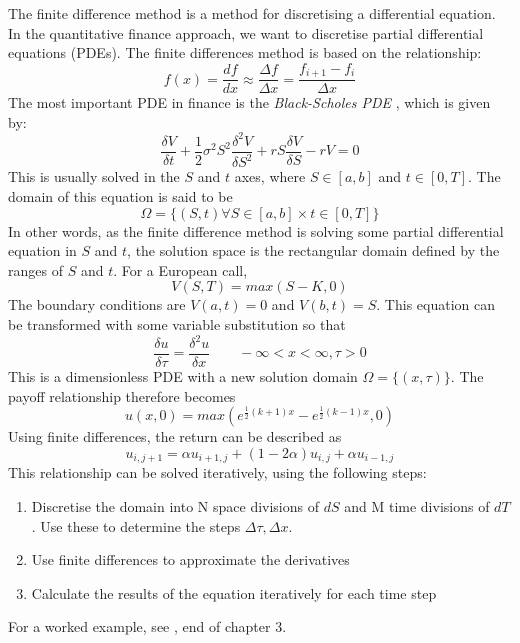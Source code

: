 The finite difference method is a method for discretising a differential equation.\cite{advancedquantcpp} In the quantitative finance approach, we want to discretise partial differential equations (PDEs). The finite differences method is based on the relationship:
\begin{equation}
f(x) = \frac{df}{dx} \approx \frac{\Delta f}{\Delta x} = \frac{f_{i+1}-f_i}{\Delta x}
\end{equation}
The most important PDE in finance is the {\em Black-Scholes PDE}
, which is given by:
\begin{equation}
\frac{\delta V}{\delta t} + \frac{1}{2}\sigma^2S^2\frac{\delta^2V}{\delta S^2}+rS\frac{\delta V}{\delta S}-rV=0
\label{eq:blackscholeseq}
\end{equation}
This is usually solved in the $S$ and $t$ axes, where $S\in [a,b]$ and $t\in [0,T]$. The domain of this equation is said to be 
\begin{equation}
\Omega=\{(S,t)\forall S\in [a,b]\times t\in [0,T]\}
\end{equation}
In other words, as the finite difference method is solving some partial differential equation in $S$ and $t$, the solution space is the rectangular domain defined by the ranges of $S$ and $t$. For a European call, 
\begin{equation}
	V(S,T) = max(S-K,0)
\end{equation}
The boundary conditions are $V(a,t)=0$ and $V(b,t)=S$. This equation can be transformed with some variable substitution so that 
\begin{equation}
\frac{\delta u}{\delta\tau}=\frac{\delta^2 u}{\delta x}\qquad -\infty<x<\infty, \tau>0
\end{equation}
This is a dimensionless PDE with a new solution domain $\Omega=\{(x,\tau)\}$. The payoff relationship therefore becomes
\begin{equation}
u(x,0) = max(e^{\frac{1}{2}(k+1)x}-e^{\frac{1}{2}(k-1)x},0)
\end{equation}
Using finite differences, the return can be described as
\begin{equation}
u_{i,j+1}=\alpha u_{i+1,j}+(1-2\alpha)u_{i,j}+\alpha u_{i-1,j}
\end{equation}
This relationship can be solved iteratively, using the following steps:

\begin{enumerate}
	\item Discretise the domain into N space divisions of $dS$ and M time divisions of $dT$. Use these to determine the steps $\Delta\tau,\Delta x$.
	\item Use finite differences to approximate the derivatives
	\item Calculate the results of the equation iteratively for each time step
\end{enumerate}

For a worked example, see \cite{advancedquantcpp}, end of chapter 3.

